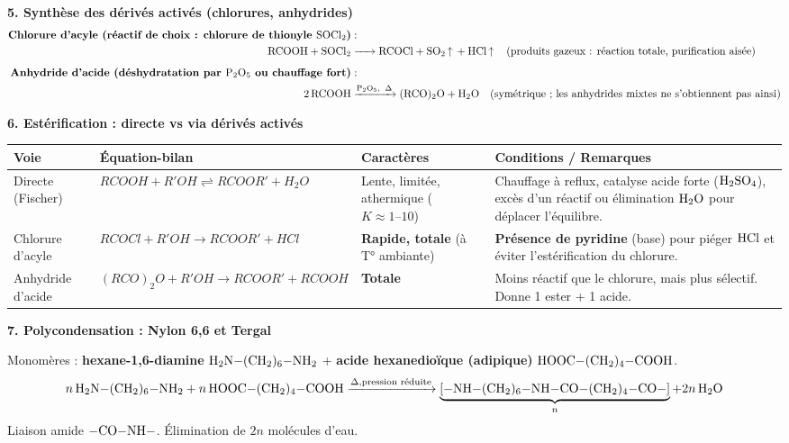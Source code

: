 \documentclass[11pt]{article}
\begin{document}
\begin{aretenir}
\textbf{5. Synthèse des dérivés activés (chlorures, anhydrides)}
\begin{align*}
\textbf{Chlorure d'acyle (réactif de choix : chlorure de thionyle $\ce{SOCl2}$)} &: \\
\ce{RCOOH + SOCl2 &-> RCOCl + SO2 ^ + HCl ^} \quad \text{(produits gazeux : réaction totale, purification aisée)} \\[0.5em]
\textbf{Anhydride d'acide (déshydratation par $\ce{P2O5}$ ou chauffage fort)} &: \\
\ce{2 RCOOH &->[P2O5,\ \Delta] (RCO)2O + H2O} \quad \text{(symétrique ; les anhydrides mixtes ne s'obtiennent pas ainsi)}
\end{align*}

\textbf{6. Estérification : directe vs via dérivés activés}
\begin{center}
\begin{tabularx}{\linewidth}{|l|X|X|X|}
\hline
\rowcolor{popblueL} \textbf{Voie} & \textbf{Équation-bilan} & \textbf{Caractères} & \textbf{Conditions / Remarques} \\
\hline
Directe (Fischer) & $RCOOH + R'OH \rightleftharpoons RCOOR' + H_2O$ & Lente, limitée, athermique ($K \approx 1\text{--}10$) & Chauffage à reflux, catalyse acide forte ($\ce{H2SO4}$), excès d'un réactif ou élimination $\ce{H2O}$ pour déplacer l'équilibre. \\
\hline
Chlorure d'acyle & $RCOCl + R'OH \rightarrow RCOOR' + HCl$ & \textbf{Rapide, totale} (à T° ambiante) & \textbf{Présence de pyridine} (base) pour piéger $\ce{HCl}$ et éviter l'estérification du chlorure. \\
\hline
Anhydride d'acide & $(RCO)_2O + R'OH \rightarrow RCOOR' + RCOOH$ & \textbf{Totale} & Moins réactif que le chlorure, mais plus sélectif. Donne 1 ester + 1 acide. \\
\hline
\end{tabularx}
\end{center}

\textbf{7. Polycondensation : Nylon 6,6 et Tergal}
\begin{exemplebox}
Monomères : \textbf{hexane-1,6-diamine} $\ce{H2N-(CH2)6-NH2}$ + \textbf{acide hexanedioïque (adipique)} $\ce{HOOC-(CH2)4-COOH}$.
\[ n\,\ce{H2N-(CH2)6-NH2} + n\,\ce{HOOC-(CH2)4-COOH} \xrightarrow{\Delta, \text{pression réduite}} \underbrace{\ce{[-NH-(CH2)6-NH-CO-(CH2)4-CO-]}}_n + 2n\,\ce{H2O} \]
Liaison amide $\ce{-CO-NH-}$. Élimination de $2n$ molécules d'eau.
\end{exemplebox}


\end{aretenir}
\end{document}
